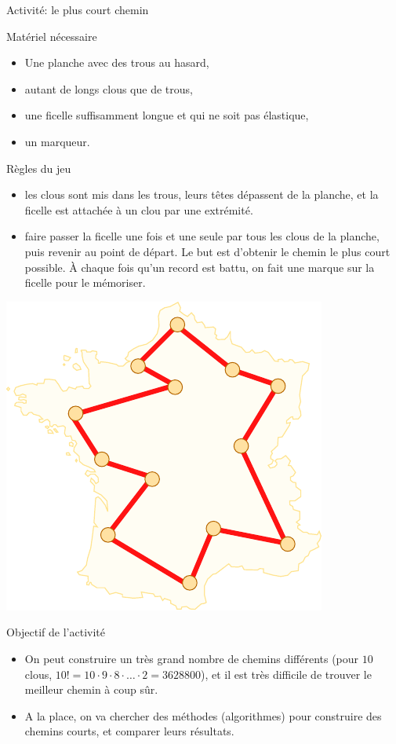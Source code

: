 \begin{frame}{Activité: le plus court chemin}
  
  \begin{block}{Matériel nécessaire}
    \begin{itemize}
    \item Une planche avec des trous au hasard,
    \item autant de longs clous que de trous,
    \item une ficelle suffisamment longue et \alert{qui ne soit pas élastique},
    \item un marqueur.
    \end{itemize}
  \end{block}

  \begin{block}{Règles du jeu}
    \begin{itemize}
    \item {} les clous sont mis dans les trous, leurs têtes dépassent de la planche, et la ficelle est attachée à un clou par une extrémité.
    \item {} faire passer la ficelle \alert{une fois et une seule} par \alert{tous les clous} de la planche, puis revenir au point de départ. Le but est d'obtenir le chemin le plus court possible. À chaque fois qu'un record est battu, on fait une marque sur la ficelle pour le mémoriser.
    \end{itemize}
  \end{block}

  \begin{center}
    \includegraphics[width=0.3\linewidth]{img/tsp.pdf}
    \label{img:tsp}
  \end{center}

  \begin{block}{Objectif de l'activité}
    \begin{itemize}
    \item On peut construire un très grand nombre de chemins différents (pour $10$ clous, $10! = 10 \cdot 9 \cdot 8 \cdot \ldots \cdot 2 = 3628800$), et il est très difficile de trouver le meilleur chemin à coup sûr.
    \item A la place, on va chercher des méthodes (algorithmes) pour construire des chemins courts, et comparer leurs résultats.
    \end{itemize}
  \end{block}

\end{frame}

